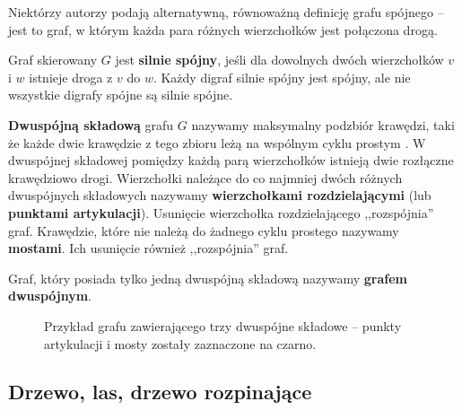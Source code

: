 Niektórzy autorzy\cite[342]{ross} podają alternatywną, równoważną\cite[42]{wilson} definicję grafu spójnego -- jest to graf, w którym każda para różnych wierzchołków jest połączona drogą. 

Graf skierowany $G$ jest \textbf{silnie spójny}, jeśli dla dowolnych dwóch wierzchołków $v$ i $w$ istnieje droga z $v$ do $w$. Każdy digraf silnie spójny jest spójny, ale nie wszystkie digrafy spójne są silnie spójne. 

\textbf{Dwuspójną składową} grafu $G$ nazywamy maksymalny podzbiór krawędzi, taki że każde dwie krawędzie z tego zbioru leżą na wspólnym cyklu prostym \cite[634]{cormen}. W dwuspójnej składowej pomiędzy każdą parą wierzchołków istnieją dwie rozłączne krawędziowo drogi. Wierzchołki należące do co najmniej dwóch różnych dwuspójnych składowych nazywamy \textbf{wierzchołkami rozdzielającymi} (lub \textbf{punktami artykulacji}\cite[633]{cormen}). Usunięcie wierzchołka rozdzielającego ,,rozspójnia'' graf. Krawędzie, które nie należą do żadnego cyklu prostego nazywamy \textbf{mostami}. Ich usunięcie również ,,rozspójnia'' graf.

Graf, który posiada tylko jedną dwuspójną składową nazywamy \textbf{grafem dwuspójnym}\cite[232]{banachowski}.

\begin{figure}[H]
\centering
{}
\captionsetup{justification=centering}
\caption{Przykład grafu zawierającego trzy dwuspójne składowe -- punkty artykulacji i mosty zostały zaznaczone na czarno.} \label{fig:biconnected-copoments-example}
\end{figure}

\subsection*{Drzewo, las, drzewo rozpinające}

